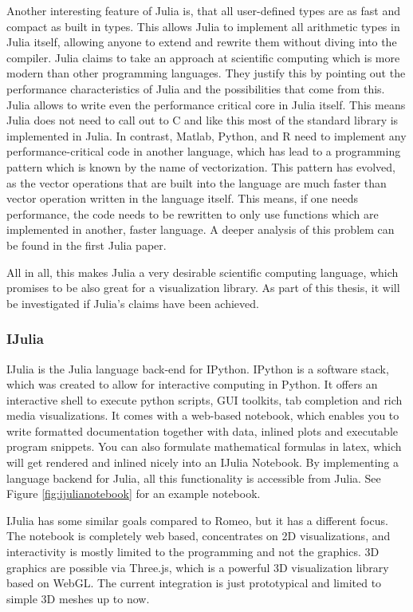 Another interesting feature of Julia is, that all user-defined types are as fast and compact as built in types.
This allows Julia to implement all arithmetic types in Julia itself, allowing anyone to extend and rewrite them without diving into the compiler.
Julia claims to take an approach at scientific computing which is more modern than other programming languages.
They justify this by pointing out the performance characteristics of Julia and the possibilities that come from this. 
Julia allows to write even the performance critical core in Julia itself. This means Julia does not need to call out to C and like this most of the standard library is implemented in Julia. 
In contrast, Matlab, Python, and R need to implement any performance-critical code in another language, which has lead to a programming pattern which is known by the name of vectorization. This pattern has evolved, as the vector operations that are built into the language are much faster than vector operation written in the language itself.
This means, if one needs performance, the code needs to be rewritten to only use functions which are implemented in another, faster language.
A deeper analysis of this problem can be found in the first Julia paper\cite{2012arXiv1209.5145B}.

All in all, this makes Julia a very desirable scientific computing language, which promises to be also great for a visualization library.
As part of this thesis, it will be investigated if Julia's claims have been achieved.



\subsubsection{IJulia}
IJulia is the Julia language back-end for IPython.
IPython is a software stack, which was created to allow for interactive computing in Python.
It offers an interactive shell to execute python scripts, \ac{GUI} toolkits, tab completion and rich media visualizations.
It comes with a web-based notebook, which enables you to write formatted documentation together with data, inlined plots and executable program snippets. You can also formulate mathematical formulas in latex, which will get rendered and inlined nicely into an IJulia Notebook. By implementing a language backend for Julia, all this functionality is accessible from Julia.
See Figure \ref{fig:ijulianotebook} for an example notebook.

IJulia has some similar goals compared to Romeo, but it has a different focus.
The notebook is completely web based, concentrates on 2D visualizations, and interactivity is mostly limited to the programming and not the graphics.
3D graphics are possible via Three.js, which is a powerful 3D visualization library based on WebGL.
The current integration is just prototypical and limited to simple 3D meshes up to now\cite{Meshes}\cite{Compose3D}.


